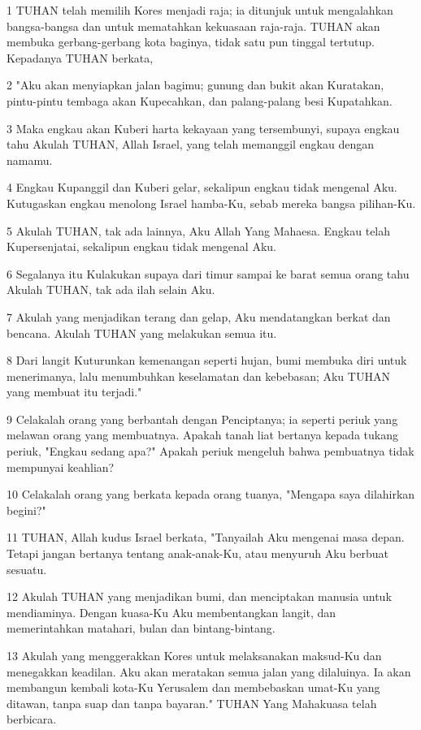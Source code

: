 \par 1 TUHAN telah memilih Kores menjadi raja; ia ditunjuk untuk mengalahkan bangsa-bangsa dan untuk mematahkan kekuasaan raja-raja. TUHAN akan membuka gerbang-gerbang kota baginya, tidak satu pun tinggal tertutup. Kepadanya TUHAN berkata,
\par 2 "Aku akan menyiapkan jalan bagimu; gunung dan bukit akan Kuratakan, pintu-pintu tembaga akan Kupecahkan, dan palang-palang besi Kupatahkan.
\par 3 Maka engkau akan Kuberi harta kekayaan yang tersembunyi, supaya engkau tahu Akulah TUHAN, Allah Israel, yang telah memanggil engkau dengan namamu.
\par 4 Engkau Kupanggil dan Kuberi gelar, sekalipun engkau tidak mengenal Aku. Kutugaskan engkau menolong Israel hamba-Ku, sebab mereka bangsa pilihan-Ku.
\par 5 Akulah TUHAN, tak ada lainnya, Aku Allah Yang Mahaesa. Engkau telah Kupersenjatai, sekalipun engkau tidak mengenal Aku.
\par 6 Segalanya itu Kulakukan supaya dari timur sampai ke barat semua orang tahu Akulah TUHAN, tak ada ilah selain Aku.
\par 7 Akulah yang menjadikan terang dan gelap, Aku mendatangkan berkat dan bencana. Akulah TUHAN yang melakukan semua itu.
\par 8 Dari langit Kuturunkan kemenangan seperti hujan, bumi membuka diri untuk menerimanya, lalu menumbuhkan keselamatan dan kebebasan; Aku TUHAN yang membuat itu terjadi."
\par 9 Celakalah orang yang berbantah dengan Penciptanya; ia seperti periuk yang melawan orang yang membuatnya. Apakah tanah liat bertanya kepada tukang periuk, "Engkau sedang apa?" Apakah periuk mengeluh bahwa pembuatnya tidak mempunyai keahlian?
\par 10 Celakalah orang yang berkata kepada orang tuanya, "Mengapa saya dilahirkan begini?"
\par 11 TUHAN, Allah kudus Israel berkata, "Tanyailah Aku mengenai masa depan. Tetapi jangan bertanya tentang anak-anak-Ku, atau menyuruh Aku berbuat sesuatu.
\par 12 Akulah TUHAN yang menjadikan bumi, dan menciptakan manusia untuk mendiaminya. Dengan kuasa-Ku Aku membentangkan langit, dan memerintahkan matahari, bulan dan bintang-bintang.
\par 13 Akulah yang menggerakkan Kores untuk melaksanakan maksud-Ku dan menegakkan keadilan. Aku akan meratakan semua jalan yang dilaluinya. Ia akan membangun kembali kota-Ku Yerusalem dan membebaskan umat-Ku yang ditawan, tanpa suap dan tanpa bayaran." TUHAN Yang Mahakuasa telah berbicara.
